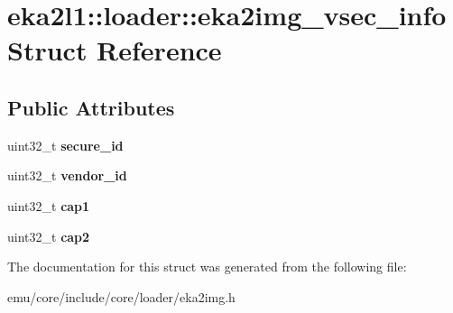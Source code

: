 \hypertarget{structeka2l1_1_1loader_1_1eka2img__vsec__info}{}\section{eka2l1\+:\+:loader\+:\+:eka2img\+\_\+vsec\+\_\+info Struct Reference}
\label{structeka2l1_1_1loader_1_1eka2img__vsec__info}
\subsection*{Public Attributes}
\begin{DoxyCompactItemize}
\item 
\mbox{\label{structeka2l1_1_1loader_1_1eka2img__vsec__info_a066456b88d80bef76fa9d3edff1a63b4}} 
uint32\+\_\+t {\bfseries secure\+\_\+id}
\item 
\mbox{\label{structeka2l1_1_1loader_1_1eka2img__vsec__info_af40b97c5831f821d7d045b1c4bd3420b}} 
uint32\+\_\+t {\bfseries vendor\+\_\+id}
\item 
\mbox{\label{structeka2l1_1_1loader_1_1eka2img__vsec__info_a31d745534014751cca7dd0a7b431e4c6}} 
uint32\+\_\+t {\bfseries cap1}
\item 
\mbox{\label{structeka2l1_1_1loader_1_1eka2img__vsec__info_a993f9091a11d605b2ed2ea286332ecdd}} 
uint32\+\_\+t {\bfseries cap2}
\end{DoxyCompactItemize}


The documentation for this struct was generated from the following file\+:\begin{DoxyCompactItemize}
\item 
emu/core/include/core/loader/eka2img.\+h\end{DoxyCompactItemize}
